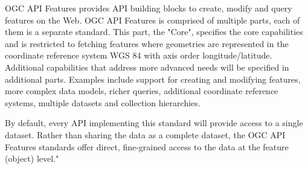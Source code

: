 OGC API Features provides API building blocks to create, modify and query features on the Web. OGC API Features is comprised of multiple parts, each of them is a separate standard. This part, the "Core", specifies the core capabilities and is restricted to fetching features where geometries are represented in the coordinate reference system WGS 84 with axis order longitude/latitude. Additional capabilities that address more advanced needs will be specified in additional parts. Examples include support for creating and modifying features, more complex data models, richer queries, additional coordinate reference systems, multiple datasets and collection hierarchies.

By default, every API implementing this standard will provide access to a single dataset. Rather than sharing the data as a complete dataset, the OGC API Features standards offer direct, fine-grained access to the data at the feature (object) level." \cite{OGCApiFeatures}